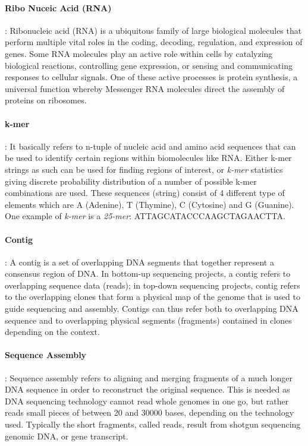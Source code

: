 \documentclass[plainarticle,zihtitle,english,final,hyperref,utf8]{zihpub}
\begin{document}
\paragraph{Ribo Nuceic Acid (RNA)}: Ribonucleic acid (RNA) is a ubiquitous family of large biological molecules that perform multiple vital roles in the coding, decoding, regulation, and expression of genes. Some RNA molecules play an active role within cells by catalyzing biological reactions, controlling gene expression, or sensing and communicating responses to cellular signals. One of these active processes is protein synthesis, a universal function whereby Messenger RNA molecules direct the assembly of proteins on ribosomes.
\paragraph{k-mer}: It basically refers to n-tuple of nucleic acid and amino acid sequences that can be used to identify certain regions within biomolecules like RNA. Either k-mer strings as such can be used for finding regions of interest, or \emph{k-mer} statistics giving discrete probability distribution of a number of possible k-mer combinations are used. These sequences (string) consist of 4 different type of elements which are A (Adenine), T (Thymine), C (Cytosine) and G (Guanine). One example of \emph{k-mer} is a \emph{25-mer}:  ATTAGCATACCCAAGCTAGAACTTA.
\paragraph{Contig}: A contig is a set of overlapping DNA segments that together represent a consensus region of DNA. In bottom-up sequencing projects, a contig refers to overlapping sequence data (reads); in top-down sequencing projects, contig refers to the overlapping clones that form a physical map of the genome that is used to guide sequencing and assembly. Contigs can thus refer both to overlapping DNA sequence and to overlapping physical segments (fragments) contained in clones depending on the context.
\paragraph{Sequence Assembly}: Sequence assembly refers to aligning and merging fragments of a much longer DNA sequence in order to reconstruct the original sequence. This is needed as DNA sequencing technology cannot read whole genomes in one go, but rather reads small pieces of between 20 and 30000 bases, depending on the technology used. Typically the short fragments, called reads, result from shotgun sequencing genomic DNA, or gene transcript. 
\end{document}

